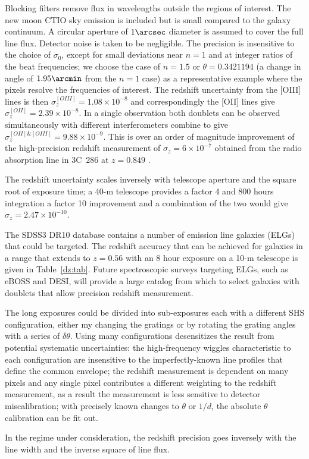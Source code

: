 \documentclass[preprint]{aastex}
\begin{document}
Blocking filters remove flux in wavelengths outside the regions
of interest.  The new moon CTIO sky emission is included but
is small compared to the galaxy continuum.
A circular aperture of $1\arcsec$ diameter is assumed to cover the full line flux.  Detector noise is taken to be negligible.
The precision is insensitive to the choice of $\sigma_0$, except
for small deviations near $n=1$ and at integer ratios of the beat frequencies; we choose
the case of $n=1.5$ or $\theta = 0.3421194$ (a change in angle of $1.95 \arcmin$ from the $n=1$ case)
as a representative example where the pixels resolve the frequencies of interest.
The redshift uncertainty from the [OIII] lines is then $\sigma_z^{[OIII]}=1.08\times 10^{-8}$
and correspondingly the [OII] lines give $\sigma_z^{[OII]}=2.39\times 10^{-8}$.  In a single observation
both doublets can be observed simultaneously with different interferometers combine to
give $\sigma_z^{[OII]\&[OIII]}=9.88\times 10^{-9}$.
This is over an order of magnitude improvement
of the high-precision redshift measurement of  $\sigma_z=6\times 10^{-7}$ obtained
from the radio absorption line in 3C~286 at $z=0.849$
\citep{1978ApJ...219....1D}.

The redshift uncertainty scales inversely with telescope aperture and the square root of exposure time;
a 40-m telescope provides a factor 4 and 800 hours integration a factor 10 improvement and a combination
of the two would give $\sigma_z=2.47\times 10^{-10}$. 

The SDSS3 DR10 database contains a number of emission line galaxies (ELGs) that could be targeted.
The redshift accuracy that can be achieved for galaxies in a range that extends  to $z=0.56$ with
an 8 hour exposure on a 10-m telescope
is given in Table~\ref{dz:tab}. 
Future spectroscopic surveys targeting ELGs, such as eBOSS and DESI, will provide a large catalog
from which to select galaxies with doublets that allow precision redshift measurement.

The long exposures could be divided into sub-exposures each with a different SHS configuration, either my changing the
gratings or by rotating the grating angles with a series of $\delta \theta$.
Using many configurations desensitizes the result from potential systematic uncertainties:
the high-frequency wiggles characteristic to each configuration
are insensitive to the imperfectly-known line profiles that define the common envelope;
the redshift measurement is dependent on many pixels and any single pixel contributes a different weighting to the redshift measurement,
as a result the measurement  is less sensitive to
detector miscalibration; with precisely known changes to $\theta$ or $1/d$, the absolute $\theta$ calibration can
be fit out. 

In the regime under consideration, the redshift precision goes inversely with the line width and the inverse square of line flux.




\end{document}
